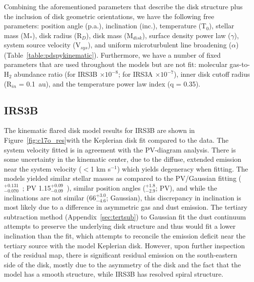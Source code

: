 Combining the aforementioned parameters that describe the disk structure plus the inclusion of disk geometric orientations, we have the following free parameters:  position angle (p.a.), inclination (inc.), temperature (T$_0$), stellar mass (M$_{*}$), disk radius (R$_D$), disk mass (M$_{disk}$), surface density power law ($\gamma$), system source velocity (V$_{sys}$), and uniform microturbulent line broadening ($\alpha$) (Table~\ref{table:pdspykinematic}). Furthermore, we have a number of fixed parameters that are used throughout the models but are not fit: molecular gas-to-H$_{2}$ abundance ratio (for IRS3B \cso{}$\times10^{-8}$; for IRS3A \htcn{}$\times10^{-7}$), inner disk cutoff radius (R$_{in}$ = 0.1~au), and the temperature power law index (q = 0.35).


\subsection{IRS3B}
The \pdspy\space kinematic flared disk model results for IRS3B are shown in Figure~\ref{fig:c17o_res}\space with the Keplerian disk fit compared to the data. The system velocity fitted is in agreement with the PV-diagram analysis. There is some uncertainty in the kinematic center, due to the diffuse, extended emission near the system velocity ($<$1 km s$^{-1}$) which yields degeneracy when fitting. The models yielded similar stellar masses as compared to the PV/Gaussian fitting (\pdspy{}$^{+0.131}_{-0.070}$~\solm; PV 1.15$^{+0.09}_{-0.09}$~\solm), similar position angles (\pdspy{}$^{+  1.8}_{-  2.9}$\deg; PV\deg), and while the inclinations are not similar (\pdspy\space$66^{+ 3.0}_{- 4.6}$\deg; Gaussian\deg), this discrepancy in inclination is most likely due to a difference in asymmetric gas and dust emission. The tertiary subtraction method (Appendix~\ref{sec:tertsub}) to Gaussian fit the dust continuum attempts to preserve the underlying disk structure and thus would fit a lower inclination than the \pdspy\space fit, which attempts to reconcile the emission deficit near the tertiary source with the model Keplerian disk. However, upon further inspection of the residual map, there is significant residual emission on the south-eastern side of the disk, mostly due to the asymmetry of the disk and the fact that the model has a smooth structure, while IRS3B has resolved spiral structure.


